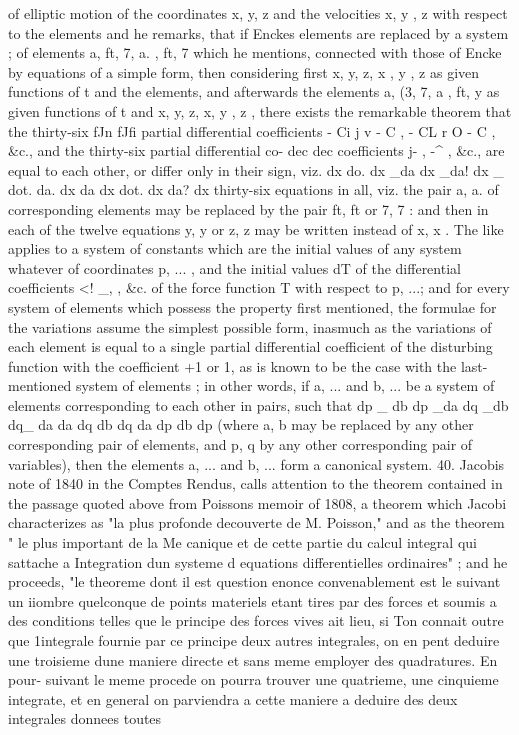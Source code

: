 \documentclass[12pt,a4paper]{article}
\theoremstyle{definition}
\begin{document}
of elliptic motion of the coordinates x, y, z and the velocities x, y , z with respect
to the elements and he remarks, that if Enckes elements are replaced by a system
;
of elements a, ft, 7, a. , ft, 7 which he mentions, connected with those of Encke by
equations of a simple form, then considering first x, y, z, x , y , z as given functions
of t and the elements, and afterwards the elements a, (3, 7, a , ft, y as given functions
of t and x, y, z, x, y , z , there exists the remarkable theorem that the thirty-six
fJn fJfi
partial differential coefficients - Ci j v - C , - CL r O - C , &c., and the thirty-six partial differential co-
dec dec
coefficients j- , -^ , &c., are equal to each other, or differ only in their sign, viz.
dx do. dx _da dx _da! dx _ dot.
da. dx da dx dot. dx da? dx
thirty-six equations in all, viz. the pair a, a. of corresponding elements may be replaced
by the pair ft, ft or 7, 7 : and then in each of the twelve equations y, y or z, z
may be written instead of x, x . The like applies to a system of constants which are
the initial values of any system whatever of coordinates p, ... , and the initial values
dT
of the differential coefficients <! _, , &c. of the force function T with respect to p, ...;
and for every system of elements which possess the property first mentioned, the formulae
for the variations assume the simplest possible form, inasmuch as the variations of each
element is equal to a single partial differential coefficient of the disturbing function with
the coefficient +1 or 1, as is known to be the case with the last-mentioned system of
elements ; in other words, if a, ... and b, ... be a system of elements corresponding
to each other in pairs, such that
dp _ db dp _da dq _db dq_ da
da dq db dq da dp db dp
(where a, b may be replaced by any other corresponding pair of elements, and p, q by
any other corresponding pair of variables), then the elements a, ... and b, ... form a
canonical system.
40. Jacobis note of 1840 in the Comptes Rendus, calls attention to the theorem
contained in the passage quoted above from Poissons memoir of 1808, a theorem
which Jacobi characterizes as "la plus profonde decouverte de M. Poisson," and as the
theorem " le plus important de la Me canique et de cette partie du calcul integral
qui sattache a Integration dun systeme d equations differentielles ordinaires" ; and he
proceeds, "le theoreme dont il est question enonce convenablement est le suivant un
iiombre quelconque de points materiels etant tires par des forces et soumis a des
conditions telles que le principe des forces vives ait lieu, si Ton connait outre que
1integrale fournie par ce principe deux autres integrales, on en pent deduire une
troisieme dune maniere directe et sans meme employer des quadratures. En pour-
suivant le meme procede on pourra trouver une quatrieme, une cinquieme integrate, et
en general on parviendra a cette maniere a deduire des deux integrales donnees toutes
\end{document}
